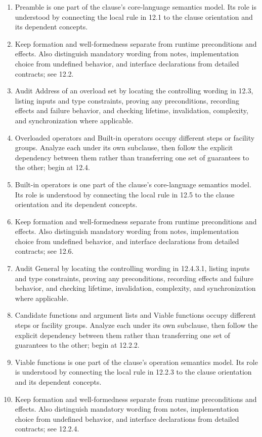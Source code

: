 \documentclass[11pt,letterpaper]{article}
\begin{document}
\begin{enumerate}
\item Preamble is one part of the clause's core-language semantics model. Its role is understood by connecting the local rule in 12.1 to the clause orientation and its dependent concepts.
\item Keep formation and well-formedness separate from runtime preconditions and effects. Also distinguish mandatory wording from notes, implementation choice from undefined behavior, and interface declarations from detailed contracts; see 12.2.
\item Audit Address of an overload set by locating the controlling wording in 12.3, listing inputs and type constraints, proving any preconditions, recording effects and failure behavior, and checking lifetime, invalidation, complexity, and synchronization where applicable.
\item Overloaded operators and Built-in operators occupy different steps or facility groups. Analyze each under its own subclause, then follow the explicit dependency between them rather than transferring one set of guarantees to the other; begin at 12.4.
\item Built-in operators is one part of the clause's core-language semantics model. Its role is understood by connecting the local rule in 12.5 to the clause orientation and its dependent concepts.
\item Keep formation and well-formedness separate from runtime preconditions and effects. Also distinguish mandatory wording from notes, implementation choice from undefined behavior, and interface declarations from detailed contracts; see 12.6.
\item Audit General by locating the controlling wording in 12.4.3.1, listing inputs and type constraints, proving any preconditions, recording effects and failure behavior, and checking lifetime, invalidation, complexity, and synchronization where applicable.
\item Candidate functions and argument lists and Viable functions occupy different steps or facility groups. Analyze each under its own subclause, then follow the explicit dependency between them rather than transferring one set of guarantees to the other; begin at 12.2.2.
\item Viable functions is one part of the clause's operation semantics model. Its role is understood by connecting the local rule in 12.2.3 to the clause orientation and its dependent concepts.
\item Keep formation and well-formedness separate from runtime preconditions and effects. Also distinguish mandatory wording from notes, implementation choice from undefined behavior, and interface declarations from detailed contracts; see 12.2.4.

\end{enumerate}
\end{document}
